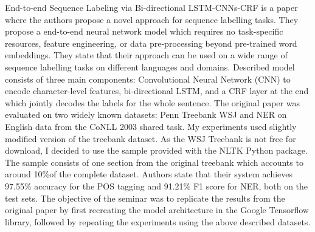 End-to-end Sequence Labeling via Bi-directional LSTM-CNNs-CRF\cite{impl} is a
paper where the authors propose a novel approach for sequence labelling tasks.
They propose a  end-to-end neural network model which requires no task-specific
resources, feature engineering, or data pre-processing beyond pre-trained word
embeddings. They state that their approach can be used on a wide range of
sequence labelling tasks on different languages and domains. Described model
consists of three main components: Convolutional Neural Network
(CNN)\cite{cnn} to encode character-level features, bi-directional
LSTM\cite{bi-lstm}, and a CRF layer at the end which jointly decodes the labels
for the whole sentence. The original paper was evaluated on two widely known
datasets: Penn Treebank WSJ\cite{wsj} and NER on English data
from the CoNLL 2003 shared task\cite{ner}. My experiments used slightly
modified version of the treebank dataset. As the WSJ Treebank is not free for
download, I decided to use the sample provided with the NLTK Python
package\cite{nltk}. The sample consists of one section from the original
treebank which accounts to around 10$\%$of the complete dataset.
Authors state that their system achieves 97.55$\%$ accuracy for the POS tagging
and 91.21$\%$ F1 score for NER, both on the test sets. The objective of the seminar
was to replicate the results from the original paper by first recreating the
model architecture in the Google Tensorflow library\cite{tens}, followed by repeating
the experiments using the above described datasets.


